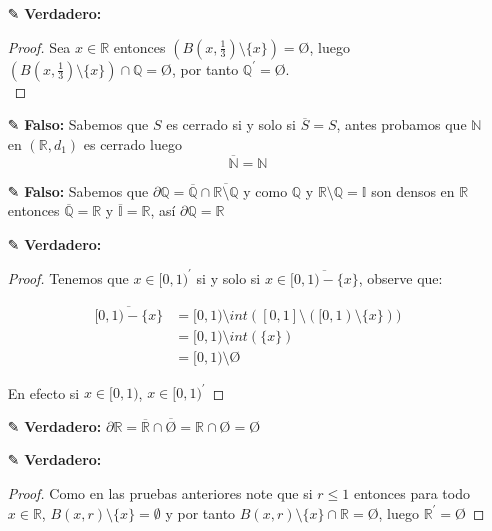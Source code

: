 \begin{itemize}[leftmargin=*]
    \item[✎]\textbf{Verdadero: }\\
    \begin{proof}
        Sea $x \in \mathbb{R}$ entonces $(B(x,\frac{1}{3})\setminus \{x\})=\text{\O}$, luego $(B(x,\frac{1}{3})\setminus \{x\})\cap \mathbb{Q}=$\O, por tanto $\mathbb{Q}^{\prime}=$\O.\\ 
    \end{proof}


    \item[✎] \textbf{Falso: }Sabemos que $S$ es cerrado si y solo si $\overline{S}=S$, antes probamos que $\mathbb{N}$ en $(\mathbb{R},d_1)$ es cerrado luego $$\overline{\mathbb{N}}=\mathbb{N}$$


    \item[✎] \textbf{Falso: }Sabemos que $\partial \mathbb{Q}=$$\overline{\mathbb{Q}}\cap$$\overline{\mathbb{R}\setminus\mathbb{Q}}$ y como $\mathbb{Q}$ y $\mathbb{R}\setminus\mathbb{Q}=\mathbb{I}$ son densos en $\mathbb{R}$ entonces $\overline{\mathbb{Q}}=\mathbb{R}$ y $\overline{\mathbb{I}}=\mathbb{R}$, así $\partial \mathbb{Q}=\mathbb{R}$


    \item[✎] \textbf{Verdadero: }\\
    \begin{proof}
        Tenemos que $x \in [0,1)^{\prime}$ si y solo si $x \in \overline{[0,1)-\{x\}}$, observe que:
        
        \begin{align*}
            \overline{[0,1)-\{x\}}&=[0,1)\setminus int([0,1]\setminus ([0,1)\setminus \{x\}))\\
            &=[0,1)\setminus int(\{x\})\\
            &=[0,1)\setminus \text{\O}
        \end{align*}
        
        En efecto si $x\in [0,1)$, $x \in [0,1)^{\prime}$ 
    \end{proof}

    \item[✎]\textbf{Verdadero: }$\partial \mathbb{R}=$$\overline{\mathbb{R}}\cap$$\overline{\text{\O}}=\mathbb{R}\cap$\O$=$\O


    \item[✎]\textbf{Verdadero: } \\
    \begin{proof}
        Como en las pruebas anteriores note que si $r\leq1$ entonces para todo $x\in \mathbb{R}$, $B(x,r)\setminus\{x\}=$$\emptyset$ y por tanto $B(x,r)\setminus\{x\}\cap \mathbb{R}=$\O, luego $\mathbb{R}^{\prime}=$\O
    \end{proof}



\end{itemize}
